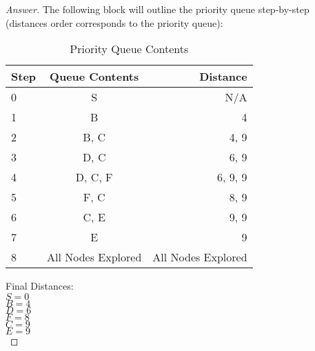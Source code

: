 \documentclass[11pt]{article}
\theoremstyle{definition}
\theoremstyle{definition}
\theoremstyle{definition}
\begin{document}
\begin{proof}[Answer]
\indent The following block will outline the priority queue step-by-step (distances order corresponds to the priority queue):
\begin{table}[h!]
	\begin{center}
		\caption{Priority Queue Contents}
		\label{tab:table1}
		\begin{tabular}{l|c|r} %
			\textbf{Step} & \textbf{Queue Contents} & \textbf{Distance}\\
			\hline
			0 & S & N/A\\
			1 & B & 4\\
			2 & B, C & 4, 9\\
			3 & D, C & 6, 9\\
			4 & D, C, F & 6, 9, 9\\
			5 & F, C & 8, 9\\
			6 & C, E & 9, 9\\
			7 & E & 9\\
			8 & All Nodes Explored & All Nodes Explored\\
		\end{tabular}
	\end{center}
\end{table}

\indent Final Distances:\\
\indent $S = 0$\\
\indent $B = 4$\\
\indent $D = 6$\\
\indent $F = 8$\\
\indent $C = 9$\\
\indent $E = 9$\\
\end{proof}




\end{document}

